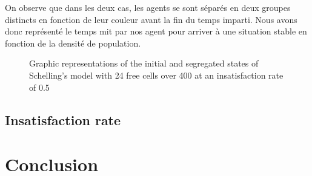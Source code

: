 \documentclass[a4paper, 12pt]{report}
\begin{document}
\newpage

On observe que dans les deux cas, les agents se sont séparés en deux groupes distincts en fonction de leur couleur avant la fin du temps imparti. Nous avons donc
représenté le temps mit par nos agent pour arriver à une situation stable en fonction de la densité de population.

\begin{figure}[!h]

	\caption{Graphic representations of the initial and segregated states of Schelling's model with 24 free cells over 400 at an insatisfaction rate of 0.5}

\end{figure}

\subsection{Insatisfaction rate}

\newpage

\section{Conclusion}
\end{document}
